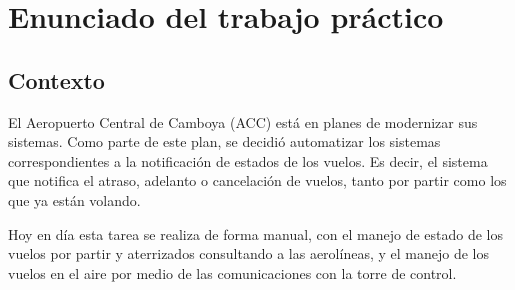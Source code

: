 \section{Enunciado del trabajo práctico}
\subsection{Contexto}
El Aeropuerto Central de Camboya (ACC) está en planes de modernizar sus sistemas. Como parte de este plan, se decidió automatizar los sistemas correspondientes a la notificación de estados de los vuelos.  Es decir, el sistema que notifica el atraso, adelanto o cancelación de vuelos, tanto por partir como los que ya están volando.

Hoy en día esta tarea se realiza de forma manual, con el manejo de estado de los vuelos por partir y aterrizados consultando a las aerolíneas, y el manejo de los vuelos en el aire por medio de las comunicaciones con la torre de control.

